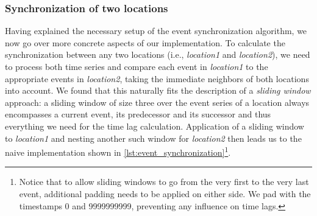 \subsubsection{Synchronization of two locations}
Having explained the necessary setup of the event synchronization algorithm, we now go over more concrete aspects of our implementation. To calculate the synchronization between any two locations (i.e., \textit{location1} and \textit{location2}), we need to process both time series and compare each event in \textit{location1} to the appropriate events in \textit{location2}, taking the immediate neighbors of both locations into account. We found that this naturally fits the description of a \textit{sliding window} approach: a sliding window of size three over the event series of a location always encompasses a current event, its predecessor and its successor and thus everything we need for the time lag calculation. Application of a sliding window to \textit{location1} and nesting another such window for \textit{location2} then leads us to the naive implementation shown in \cref{lst:event_synchronization}\footnote{Notice that to allow sliding windows to go from the very first to the very last event, additional padding needs to be applied on either side. We pad with the timestamps 0 and 9999999999, preventing any influence on time lags.}.

